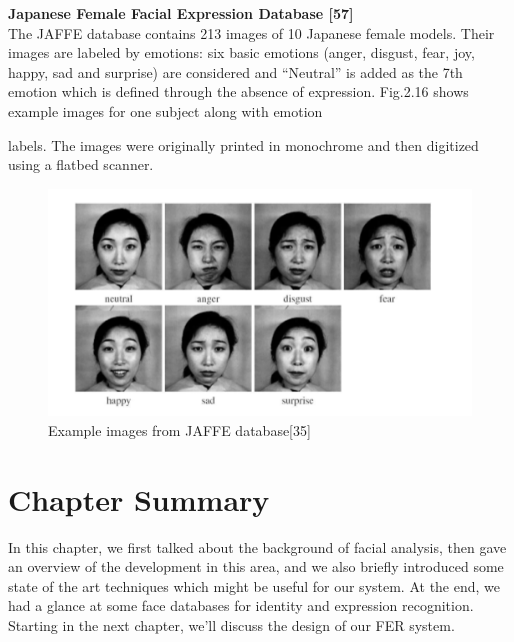 \documentclass[12pt, twoside]{report}
\begin{document}
	\noindent \textbf{Japanese Female Facial Expression Database [57]}
	\vspace{0.3cm} \\
	The JAFFE database contains 213 images of 10 Japanese female models. Their images are labeled by emotions: six basic emotions (anger, disgust, fear, joy, happy, sad and surprise) are considered and “Neutral” is added as the 7th emotion which is defined through the absence of expression. Fig.2.16 shows example images for one subject along with emotion

	\newpage
	
	\begin{table}
		\caption{Commonly used expression recognition databases [35] }
  		\centering
	\end{table}

	labels. The images were originally printed in monochrome and then digitized using a flatbed scanner.
	
	\begin{figure}
		\includegraphics[width=\textwidth]{img/94_1.jpg}
		\caption{Example images from JAFFE database[35]}
		\label{Fig 2.16}
	\end{figure}
	\section{Chapter Summary}
	\par
	In this chapter, we first talked about the background of facial analysis, then gave an overview of the development in this area, and we also briefly introduced some state of the art techniques which might be useful for our system. At the end, we had a glance at some face databases for identity and expression recognition. Starting in the next chapter, we'll discuss the design of our FER system.
\end{document}

